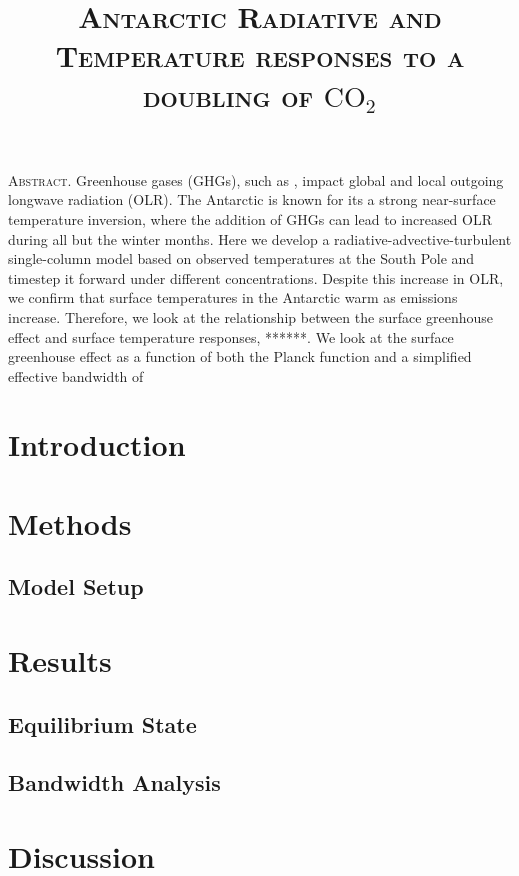 \documentclass[12]{article}
\title{{\textsc{\Large Antarctic Radiative and Temperature responses to a doubling of $\text{CO}_2$}}}
\author{\textsc{}}
\begin{document}
\maketitle
\thispagestyle{empty}

\setlength{\leftskip}{1.1cm}
\setlength{\rightskip}{1.1cm}


\bigskip
\bigskip

{\textsc{Abstract.} }Greenhouse gases (GHGs), such as , impact global and local outgoing longwave radiation (OLR). The Antarctic is known for its a strong near-surface temperature inversion, where the addition of GHGs can lead to increased OLR during all but the winter months.  Here we develop a radiative-advective-turbulent single-column model based on observed temperatures at the South Pole and timestep it forward under different  concentrations. Despite this increase in OLR, we confirm that surface temperatures in the Antarctic warm as  emissions increase. Therefore, we look at the relationship between the surface greenhouse effect and surface temperature responses, ******. We look at the surface greenhouse effect as a function of both the Planck function and a simplified effective bandwidth of  

\section{Introduction}
\section{Methods}
\subsection{Model Setup}
\section{Results}
\subsection{Equilibrium State}
\subsection{Bandwidth Analysis}
\section{Discussion}



\end{document}
